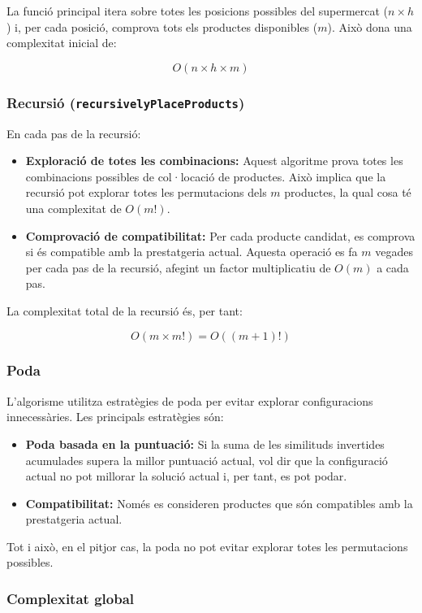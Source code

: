 \documentclass[a4paper,12pt]{report}
\begin{document}
\begin{itemize}
La funció principal itera sobre totes les posicions possibles del supermercat (\(n \times h\)) i, per cada posició, comprova tots els productes disponibles (\(m\)). Això dona una complexitat inicial de:

\[
O(n \times h \times m)
\]

\subsubsection{Recursió (\texttt{recursivelyPlaceProducts})}

En cada pas de la recursió:
\begin{itemize}
    \item \textbf{Exploració de totes les combinacions:} Aquest algoritme prova totes les combinacions possibles de col·locació de productes. Això implica que la recursió pot explorar totes les permutacions dels \(m\) productes, la qual cosa té una complexitat de \(O(m!)\).
    \item \textbf{Comprovació de compatibilitat:} Per cada producte candidat, es comprova si és compatible amb la prestatgeria actual. Aquesta operació es fa \(m\) vegades per cada pas de la recursió, afegint un factor multiplicatiu de \(O(m)\) a cada pas.
\end{itemize}

La complexitat total de la recursió és, per tant:

\[
O(m \times m!) = O((m+1)!)
\]

\subsubsection{Poda}

L'algorisme utilitza estratègies de poda per evitar explorar configuracions innecessàries. Les principals estratègies són:
\begin{itemize}
    \item \textbf{Poda basada en la puntuació:} Si la suma de les similituds invertides acumulades supera la millor puntuació actual, vol dir que la configuració actual no pot millorar la solució actual i, per tant, es pot podar.
    \item \textbf{Compatibilitat:} Només es consideren productes que són compatibles amb la prestatgeria actual.
\end{itemize}

Tot i això, en el pitjor cas, la poda no pot evitar explorar totes les permutacions possibles.

\subsubsection{Complexitat global}


\end{itemize}
\end{document}

